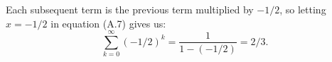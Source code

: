 \exercise
Each subsequent term is the previous term multiplied by $-1/2$, so letting $x=-1/2$ in equation (A.7) gives us:
\[
    \sum_{k=0}^\infty(-1/2)^k = \frac{1}{1-(-1/2)} = 2/3.
\]
